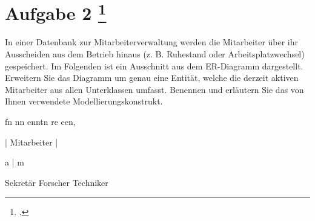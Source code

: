 \documentclass{lehramt-informatik-aufgabe}
\begin{document}
\section{Aufgabe 2
\footcite{examen:66116:2019:09}}

In einer Datenbank zur Mitarbeiterverwaltung werden die Mitarbeiter über
ihr Ausscheiden aus dem Betrieb hinaus (z. B. Ruhestand oder
Arbeitsplatzwechsel) gespeichert. Im Folgenden ist ein Ausschnitt aus
dem ER-Diagramm dargestellt. Erweitern Sie das Diagramm um genau eine
Entität, welche die derzeit aktiven Mitarbeiter aus allen Unterklassen
umfasst. Benennen und erläutern Sie das von Ihnen verwendete
Modellierungskonstrukt.

fn nn enntn re een,

|
Mitarbeiter |

a | m

Sekretär Forscher Techniker
\end{document}

